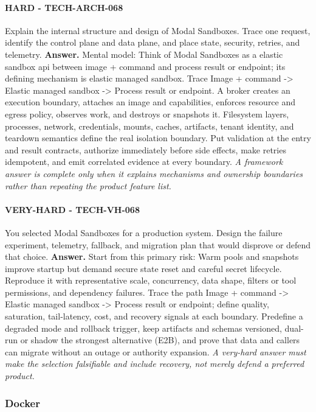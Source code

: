 \paragraph{HARD - TECH-ARCH-068} Explain the internal structure and design of Modal Sandboxes. Trace one request, identify the control plane and data plane, and place state, security, retries, and telemetry.
\textbf{Answer.} Mental model: Think of Modal Sandboxes as a elastic sandbox api between image + command and process result or endpoint; its defining mechanism is elastic managed sandbox. Trace Image + command -> Elastic managed sandbox -> Process result or endpoint. A broker creates an execution boundary, attaches an image and capabilities, enforces resource and egress policy, observes work, and destroys or snapshots it. Filesystem layers, processes, network, credentials, mounts, caches, artifacts, tenant identity, and teardown semantics define the real isolation boundary. Put validation at the entry and result contracts, authorize immediately before side effects, make retries idempotent, and emit correlated evidence at every boundary.
\textit{A framework answer is complete only when it explains mechanisms and ownership boundaries rather than repeating the product feature list.}
\paragraph{VERY-HARD - TECH-VH-068} You selected Modal Sandboxes for a production system. Design the failure experiment, telemetry, fallback, and migration plan that would disprove or defend that choice.
\textbf{Answer.} Start from this primary risk: Warm pools and snapshots improve startup but demand secure state reset and careful secret lifecycle. Reproduce it with representative scale, concurrency, data shape, filters or tool permissions, and dependency failures. Trace the path Image + command -> Elastic managed sandbox -> Process result or endpoint; define quality, saturation, tail-latency, cost, and recovery signals at each boundary. Predefine a degraded mode and rollback trigger, keep artifacts and schemas versioned, dual-run or shadow the strongest alternative (E2B), and prove that data and callers can migrate without an outage or authority expansion.
\textit{A very-hard answer must make the selection falsifiable and include recovery, not merely defend a preferred product.}
\subsubsection*{Docker}
